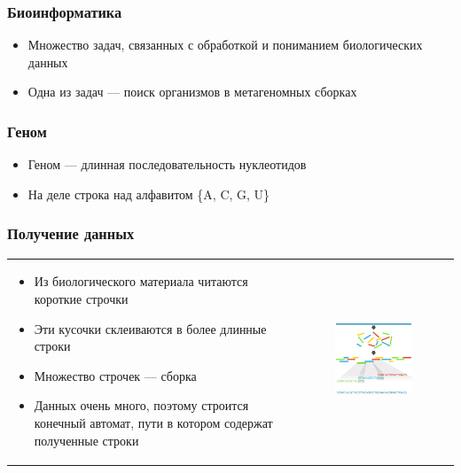 \documentclass{beamer}
\begin{document}
    \begin{frame}
        \frametitle{Биоинформатика}
        \begin{itemize}
            \item Множество задач, связанных с обработкой и пониманием биологических данных
            \item Одна из задач --- поиск организмов в метагеномных сборках
        \end{itemize}
    \end{frame}
    
    \begin{frame}
        \frametitle{Геном}
        \begin{itemize}
            \item Геном --- длинная последовательность нуклеотидов
            \item На деле строка над алфавитом \{A, C, G, U\}
        \end{itemize}
    \end{frame}
    
    \begin{frame}
        \frametitle{Получение данных}
        \begin{tabular}{p{5cm} p{7cm}}
            \begin{itemize}
                \item Из биологического материала читаются короткие строчки
                \item Эти кусочки склеиваются в более длинные строки
                \item Множество строчек --- сборка
                \item Данных очень много, поэтому строится конечный автомат, пути в котором содержат полученные строки
            \end{itemize}
            &
            \begin{figure}[b]
                \centering
                \includegraphics[width=6.5cm]{pictures/readsAssembly.png}  
            \end{figure}
        \end{tabular}
    \end{frame}
    
\end{document}
